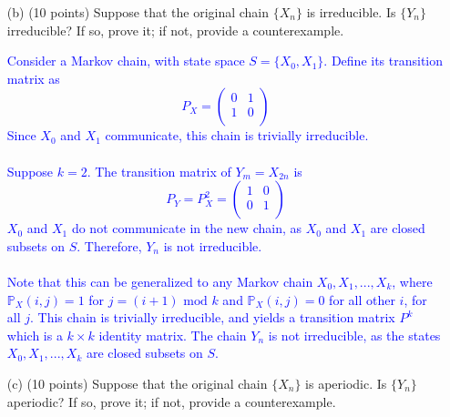 \documentclass{article}
\begin{document}
\begin{enumerate}
{%
}

        
        \item[(b)] (10 points) Suppose that the original chain $\{X_n\}$ is irreducible. Is $\{Y_n\}$ irreducible? If so, prove it; if not, provide a counterexample.

            \textcolor{blue}{
            Consider a Markov chain, with state space $S=\{X_0, X_1\}$. Define its transition matrix as $$P_X=
  \left( {\begin{array}{cc}
   0 & 1 \\
   1 & 0 \\
  \end{array} } \right)$$
  Since $X_0$ and $X_1$ communicate, this chain is trivially irreducible. \\ \\ 
  Suppose $k=2$. The transition matrix of $Y_m=X_{2n}$ is $$P_Y=P_X^2=\left( {\begin{array}{cc}
   1 & 0 \\
   0 & 1 \\
  \end{array} } \right)$$
  $X_0$ and $X_1$ do not communicate in the new chain, as $X_0$ and $X_1$ are closed subsets on $S$. Therefore, $Y_n$ is not irreducible. \\ \\ 
  Note that this can be generalized to any Markov chain $X_0, X_1,...,X_k$, where $\mathbb{P}_X(i,j)=1$ for $j = (i + 1) \text{ mod } k$ and $\mathbb{P}_X(i,j)=0$ for all other $i$, for all $j$. This chain is trivially irreducible, and yields a transition matrix $P^k$ which is a $k\times k$ identity matrix. The chain $Y_n$ is not irreducible, as the states $X_0, X_1,...,X_k$ are closed subsets on $S$.
               }

        
        \item[(c)] (10 points) Suppose that the original chain $\{X_n\}$ is aperiodic. Is $\{Y_n\}$ aperiodic? If so, prove it; if not, provide a counterexample.


\end{enumerate}
\end{document}
